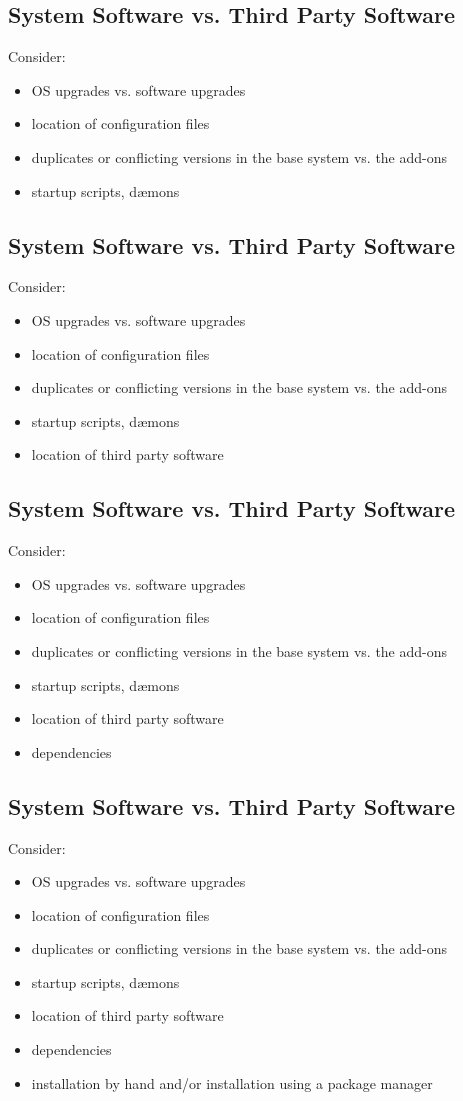 \documentclass[xga]{xdvislides}
\begin{document}
\subsection{System Software vs. Third Party Software}
Consider:
\begin{itemize}
	\item OS upgrades vs. software upgrades
	\item location of configuration files
	\item duplicates or conflicting versions in the base system vs. the
		add-ons
	\item startup scripts, d{\ae}mons
\end{itemize}

\subsection{System Software vs. Third Party Software}
Consider:
\begin{itemize}
	\item OS upgrades vs. software upgrades
	\item location of configuration files
	\item duplicates or conflicting versions in the base system vs. the
		add-ons
	\item startup scripts, d{\ae}mons
	\item location of third party software
\end{itemize}

\subsection{System Software vs. Third Party Software}
Consider:
\begin{itemize}
	\item OS upgrades vs. software upgrades
	\item location of configuration files
	\item duplicates or conflicting versions in the base system vs. the
		add-ons
	\item startup scripts, d{\ae}mons
	\item location of third party software
	\item dependencies
\end{itemize}

\subsection{System Software vs. Third Party Software}
Consider:
\begin{itemize}
	\item OS upgrades vs. software upgrades
	\item location of configuration files
	\item duplicates or conflicting versions in the base system vs. the
		add-ons
	\item startup scripts, d{\ae}mons
	\item location of third party software
	\item dependencies
	\item installation by hand and/or installation using a package manager
\end{itemize}
\end{document}
